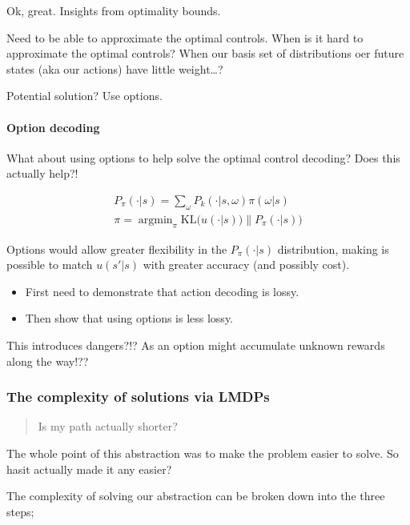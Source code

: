 Ok, great. Insights from optimality bounds.

Need to be able to approximate the optimal controls. When is it hard to
approximate the optimal controls? When our basis set of distributions
oer future states (aka our actions) have little weight\ldots{}?

Potential solution? Use options.

\hypertarget{option-decoding}{%
\paragraph{Option decoding}\label{option-decoding}}

What about using options to help solve the optimal control decoding?
Does this actually help?!

\begin{align}
P_{\pi}(\cdot | s) = \sum_\omega P_k(\cdot | s, \omega) \pi(\omega | s) \\
\pi = \mathop{\text{argmin}}_{\pi} \text{KL}\Big(u(\cdot | s))\parallel P_{\pi}(\cdot | s)\Big)
\end{align}

Options would allow greater flexibility in the \(P_{\pi}(\cdot | s)\)
distribution, making is possible to match \(u(s'|s)\) with greater
accuracy (and possibly cost).

\begin{itemize}
\tightlist
\item
  First need to demonstrate that action decoding is lossy.
\item
  Then show that using options is less lossy.
\end{itemize}

This introduces dangers?!? As an option might accumulate unknown rewards
along the way!??

\hypertarget{the-complexity-of-solutions-via-lmdps}{%
\subsubsection{The complexity of solutions via
LMDPs}\label{the-complexity-of-solutions-via-lmdps}}

\begin{quote}
Is my path actually shorter?
\end{quote}

The whole point of this abstraction was to make the problem easier to
solve. So hasit actually made it any easier?

The complexity of solving our abstraction can be broken down into the
three steps;

